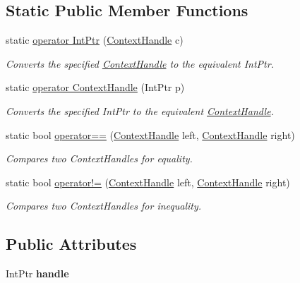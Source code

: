\subsection*{Static Public Member Functions}
\begin{DoxyCompactItemize}
\item 
static \hyperlink{struct_open_t_k_1_1_context_handle_afe60b9eefe44b6b1bc9dca2e8241f7d7}{operator Int\-Ptr} (\hyperlink{struct_open_t_k_1_1_context_handle}{Context\-Handle} c)
\begin{DoxyCompactList}\small\item\em Converts the specified \hyperlink{struct_open_t_k_1_1_context_handle}{Context\-Handle} to the equivalent Int\-Ptr. \end{DoxyCompactList}\item 
static \hyperlink{struct_open_t_k_1_1_context_handle_ae5a727d7e97ecf5a9b19aaae0c393ecc}{operator Context\-Handle} (Int\-Ptr p)
\begin{DoxyCompactList}\small\item\em Converts the specified Int\-Ptr to the equivalent \hyperlink{struct_open_t_k_1_1_context_handle}{Context\-Handle}. \end{DoxyCompactList}\item 
static bool \hyperlink{struct_open_t_k_1_1_context_handle_a18ab9a9c5a6b948f94704b38c8e48727}{operator==} (\hyperlink{struct_open_t_k_1_1_context_handle}{Context\-Handle} left, \hyperlink{struct_open_t_k_1_1_context_handle}{Context\-Handle} right)
\begin{DoxyCompactList}\small\item\em Compares two Context\-Handles for equality. \end{DoxyCompactList}\item 
static bool \hyperlink{struct_open_t_k_1_1_context_handle_acfb221980963d886bb4a8b65397b1c9c}{operator!=} (\hyperlink{struct_open_t_k_1_1_context_handle}{Context\-Handle} left, \hyperlink{struct_open_t_k_1_1_context_handle}{Context\-Handle} right)
\begin{DoxyCompactList}\small\item\em Compares two Context\-Handles for inequality. \end{DoxyCompactList}\end{DoxyCompactItemize}
\subsection*{Public Attributes}
\begin{DoxyCompactItemize}
\item 
\hypertarget{struct_open_t_k_1_1_context_handle_adf7043e0734eaf9f7d3cad9420ec7d29}{Int\-Ptr {\bfseries handle}}\label{struct_open_t_k_1_1_context_handle_adf7043e0734eaf9f7d3cad9420ec7d29}

\end{DoxyCompactItemize}
